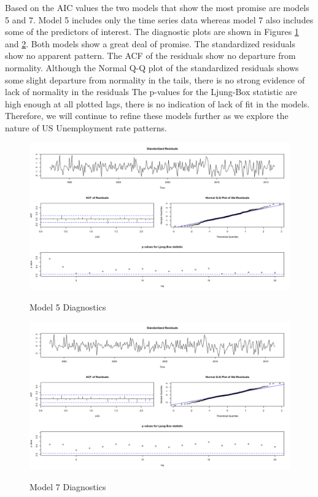 {		Based on the AIC values the two models that show the most promise are models 5 and 7.  Model 5 includes only the time series data whereas model 7 also includes some of the predictors of interest.  The diagnostic plots are shown in Figures \ref{fig:mod5} and \ref{fig:mod7}. Both models show a great deal of promise.  The standardized residuals show no apparent pattern. The ACF of the residuals show no departure from normality. Although the Normal Q-Q plot of the standardized residuals shows some slight departure from normality in the tails, there is no strong evidence of lack of normality in the residuals  The p-values for the  Ljung-Box statistic are high enough at all plotted lags, there is no indication of lack of fit in the models. Therefore, we will continue to refine these models further as we explore the nature of US Unemployment rate patterns.

\begin{figure}[H]
      	\centering
      	\caption{Model 5 Diagnostics}
      	\includegraphics[width=\linewidth]{images/mod5}
      	\label{fig:mod5}
\end{figure}

\begin{figure}[H]
      	\centering
      	\caption{Model 7 Diagnostics}
      	\includegraphics[width=\linewidth]{images/mod7}
      	\label{fig:mod7}
\end{figure}

\begin{flushleft}
\end{flushleft}
}
  

